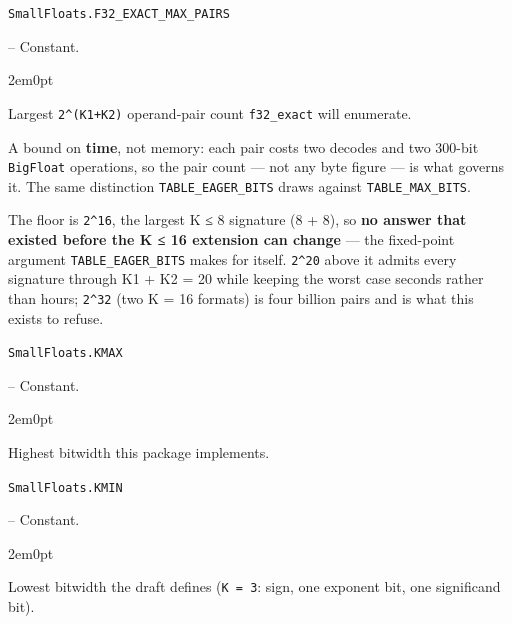 \par\medskip\noindent\begin{minipage}{\linewidth}
\hypertarget{16003865593099067000}{\texttt{SmallFloats.F32\_\allowbreak{}EXACT\_\allowbreak{}MAX\_\allowbreak{}PAIRS}}  -- {Constant.}
\nopagebreak
\begin{adjustwidth}{2em}{0pt}

Largest \texttt{2{\textasciicircum}(K1+K2)} operand-pair count \texttt{f32\_\allowbreak{}exact} will enumerate.

A bound on \textbf{time}, not memory: each pair costs two decodes and two 300-bit \texttt{BigFloat} operations, so the pair count — not any byte figure — is what governs it. The same distinction \texttt{TABLE\_\allowbreak{}EAGER\_\allowbreak{}BITS} draws against \texttt{TABLE\_\allowbreak{}MAX\_\allowbreak{}BITS}.

The floor is \texttt{2{\textasciicircum}16}, the largest K ≤ 8 signature (8 + 8), so \textbf{no answer that existed before the K ≤ 16 extension can change} — the fixed-point argument \texttt{TABLE\_\allowbreak{}EAGER\_\allowbreak{}BITS} makes for itself. \texttt{2{\textasciicircum}20} above it admits every signature through K1 + K2 = 20 while keeping the worst case seconds rather than hours; \texttt{2{\textasciicircum}32} (two K = 16 formats) is four billion pairs and is what this exists to refuse.



\end{adjustwidth}
\end{minipage}
\par\medskip

\par\medskip\noindent\begin{minipage}{\linewidth}
\hypertarget{5954863807747789738}{\texttt{SmallFloats.KMAX}}  -- {Constant.}
\nopagebreak
\begin{adjustwidth}{2em}{0pt}

Highest bitwidth this package implements.



\end{adjustwidth}
\end{minipage}
\par\medskip

\par\medskip\noindent\begin{minipage}{\linewidth}
\hypertarget{9537035174923712895}{\texttt{SmallFloats.KMIN}}  -- {Constant.}
\nopagebreak
\begin{adjustwidth}{2em}{0pt}

Lowest bitwidth the draft defines (\texttt{K = 3}: sign, one exponent bit, one significand bit).



\end{adjustwidth}
\end{minipage}
\par\medskip

